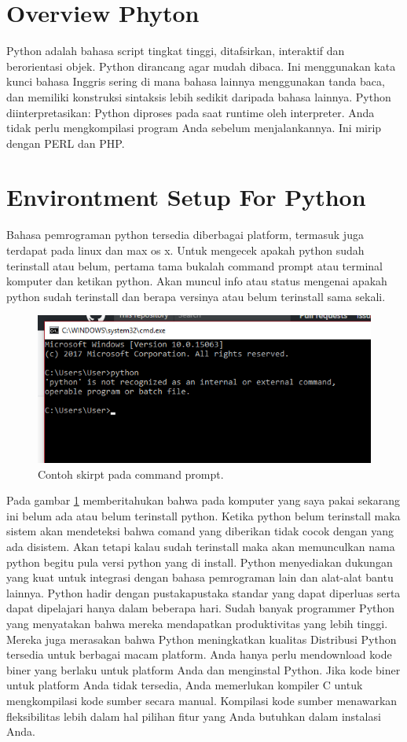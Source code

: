 \section{Overview Phyton}
Python adalah bahasa script tingkat tinggi, ditafsirkan,
interaktif dan berorientasi objek. Python dirancang agar
mudah dibaca. Ini menggunakan kata kunci bahasa Inggris
sering di mana bahasa lainnya menggunakan tanda baca,
dan memiliki konstruksi sintaksis lebih sedikit daripada
bahasa lainnya.
Python diinterpretasikan: Python diproses pada saat runtime
oleh interpreter. Anda tidak perlu mengkompilasi program
Anda sebelum menjalankannya. Ini mirip dengan PERL dan
PHP.

\section{Environtment Setup For Python}
Bahasa pemrograman python tersedia diberbagai platform, termasuk juga terdapat pada 
linux dan max os x. Untuk mengecek apakah python sudah terinstall atau belum, pertama 
tama bukalah command prompt atau terminal komputer dan ketikan python. Akan muncul info 
atau status mengenai apakah python sudah terinstall dan berapa versinya atau belum terinstall sama sekali.
  \begin{figure}[ht]
	\centerline{\includegraphics[width=1\textwidth]{Plagiarisme/cmd.PNG}}
	\caption{Contoh skirpt pada command prompt.}
	\label{cmd}
	\end{figure}
Pada gambar \ref{cmd} memberitahukan bahwa pada komputer yang saya pakai sekarang ini belum ada atau belum terinstall python.
Ketika python belum terinstall maka sistem akan mendeteksi bahwa comand yang diberikan tidak cocok dengan yang ada disistem. 
Akan tetapi kalau sudah terinstall maka akan memunculkan nama python begitu pula versi python yang di install.
Python menyediakan dukungan yang kuat untuk integrasi dengan bahasa pemrograman lain dan alat-alat bantu lainnya. 
Python hadir dengan pustakapustaka standar yang dapat diperluas serta dapat dipelajari hanya dalam beberapa hari.
Sudah banyak programmer Python yang menyatakan bahwa mereka mendapatkan produktivitas yang lebih tinggi. 
Mereka juga merasakan bahwa Python meningkatkan kualitas 
Distribusi Python tersedia untuk berbagai macam platform.
Anda hanya perlu mendownload kode biner yang berlaku untuk platform Anda dan menginstal Python.
Jika kode biner untuk platform Anda tidak tersedia, Anda memerlukan kompiler C untuk mengkompilasi kode sumber secara manual. 
Kompilasi kode sumber menawarkan fleksibilitas lebih dalam hal pilihan fitur yang Anda butuhkan dalam instalasi Anda.

